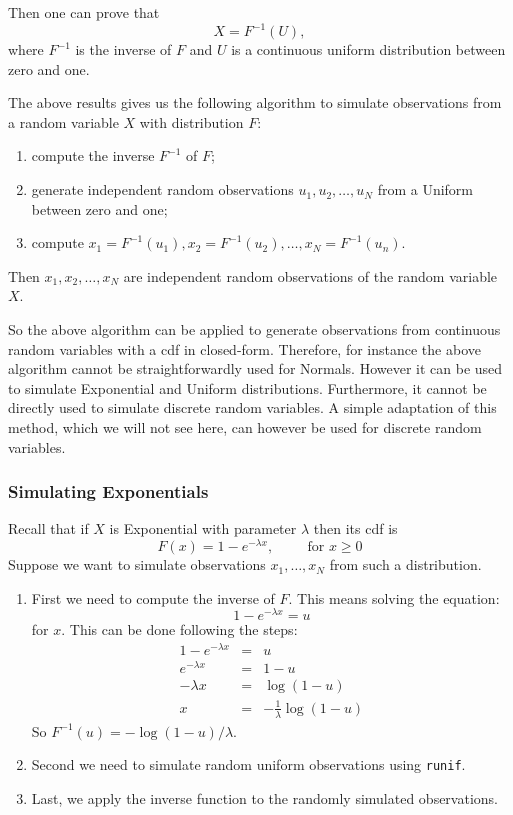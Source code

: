 \documentclass[
]{book}
\theoremstyle{definition}
\theoremstyle{definition}
\theoremstyle{definition}
\theoremstyle{definition}
\theoremstyle{remark}
\begin{document}
Then one can prove that
\[
X = F^{-1}(U),
\]
where \(F^{-1}\) is the inverse of \(F\) and \(U\) is a continuous uniform distribution between zero and one.

The above results gives us the following algorithm to simulate observations from a random variable \(X\) with distribution \(F\):

\begin{enumerate}
\def\labelenumi{\arabic{enumi}.}
\item
  compute the inverse \(F^{-1}\) of \(F\);
\item
  generate independent random observations \(u_1,u_2,\dots,u_N\) from a Uniform between zero and one;
\item
  compute \(x_1=F^{-1}(u_1), x_2=F^{-1}(u_2),\dots,x_N=F^{-1}(u_n)\).
\end{enumerate}

Then \(x_1,x_2,\dots,x_N\) are independent random observations of the random variable \(X\).

So the above algorithm can be applied to generate observations from continuous random variables with a cdf in closed-form. Therefore, for instance the above algorithm cannot be straightforwardly used for Normals. However it can be used to simulate Exponential and Uniform distributions. Furthermore, it cannot be directly used to simulate discrete random variables. A simple adaptation of this method, which we will not see here, can however be used for discrete random variables.

\hypertarget{simulating-exponentials}{%
\subsubsection{Simulating Exponentials}\label{simulating-exponentials}}

Recall that if \(X\) is Exponential with parameter \(\lambda\) then its cdf is
\[
F(x)= 1- e^{-\lambda x}, \hspace{1cm} \mbox{for } x\geq 0
\]
Suppose we want to simulate observations \(x_1,\dots,x_N\) from such a distribution.

\begin{enumerate}
\def\labelenumi{\arabic{enumi}.}
\item
  First we need to compute the inverse of \(F\). This means solving the equation:
  \[
  1-e^{-\lambda x} = u
  \]
  for \(x\). This can be done following the steps:
  \begin{eqnarray*}
  1-e^{-\lambda x} &=& u\\
  e^{-\lambda x} &=& 1 - u\\
  -\lambda x &=& \log(1-u)\\
  x &=& -\frac{1}{\lambda}\log(1-u)
  \end{eqnarray*}
  So \(F^{-1}(u)=-\log(1-u)/\lambda\).
\item
  Second we need to simulate random uniform observations using \texttt{runif}.
\item
  Last, we apply the inverse function to the randomly simulated observations.
\end{enumerate}
\end{document}

